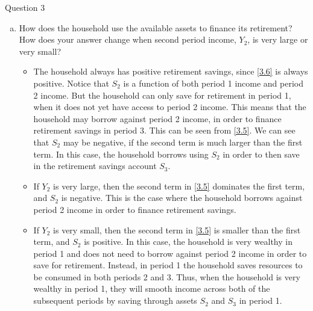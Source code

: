 \documentclass[a4paper]{article}
\begin{document}
\begin{questionbox}{Question 3}
\begin{enumerate}[(a)]
\begin{explanationbox}
\begin{equation}
				\end{equation}
				Substituting \cref{3.4} into \cref{3.5} to find \( S_3 \):
				\begin{align}
					S_3 &= \frac{\beta^2}{1+\beta^2}(Y_1 - \frac{\beta}{1 + \beta + \beta^2} Y_1 - \frac{1 + \beta^2}{R_2(1 + \beta + \beta^2)}Y_2) \notag \\
					&= \frac{\beta^2}{1+\beta^2}\left( \frac{1 + \beta^2}{R_2(1 + \beta + \beta^2)}Y_1 + \frac{1 + \beta^2}{R_2(1 + \beta + \beta^2)}Y_2 \right) \notag
				\intertext{Which, tidying up, yields the expression for \( S_3 \):}
				S_3 &= \frac{\beta^2}{1 + \beta + \beta^2} \left( Y_1 + \frac{Y_2}{R_2} \right) \label{3.6}
				\end{align}
			\end{explanationbox}
			\item How does the household use the available assets to finance its retirement? How does your answer change when second period income, \( Y_2 \), is very large or very small?
			\begin{explanationbox}
				\begin{itemize}
					\item The household always has positive retirement savings, since \cref{3.6} is always positive. Notice that \( S_2 \) is a function of both period 1 income and period 2 income. But the household can only save for retirement in period 1, when it does not yet have access to period 2 income. This means that the household may borrow against period 2 income, in order to finance retirement savings in period 3. This can be seen from \cref{3.5}. We can see that \( S_2 \) may be negative, if the second term is much larger than the first term. In this case, the household borrows using \( S_2 \) in order to then save in the retirement savings account \( S_3 \).
					\item If \( Y_2 \) is very large, then the second term in \cref{3.5} dominates the first term, and \( S_2 \) is negative. This is the case where the household borrows against period 2 income in order to finance retirement savings.
					\item If \( Y_2 \) is very small, then the second term in \cref{3.5} is smaller than the first term, and \( S_2 \) is positive. In this case, the household is very wealthy in period 1 and does not need to borrow against period 2 income in order to save for retirement. Instead, in period 1 the household saves resources to be consumed in both periods 2 and 3. Thus, when the household is very wealthy in period 1, they will smooth income across both of the subsequent periods by saving through assets \( S_2 \) and \( S_3 \) in period 1.

\end{itemize}
\end{explanationbox}
\end{enumerate}
\end{questionbox}
\end{document}
